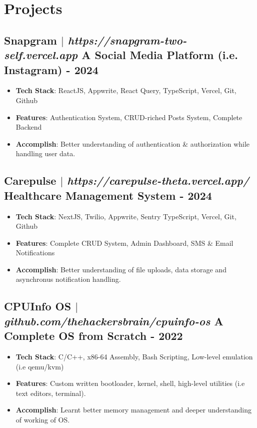 \documentclass[11pt]{article} %
\begin{document}
\section{Projects}
\subsection{Snapgram $|$ \normalfont\textit{https://snapgram-two-self.vercel.app} \hfill A Social Media Platform (i.e. Instagram) - \textbf{2024}}
\vspace{3pt}
\begin{itemize}
  \item \textbf{Tech Stack}: ReactJS, Appwrite, React Query, TypeScript, Vercel, Git, Github
  \item \textbf{Features}: Authentication System, CRUD-riched Posts System, Complete Backend
  \item \textbf{Accomplish}: Better understanding of authentication \& authorization while handling user data.
\end{itemize}

\subsection{Carepulse $|$ \normalfont\textit{https://carepulse-theta.vercel.app/} \hfill Healthcare Management System - \textbf{2024}}
\vspace{3pt}
\begin{itemize}
  \item \textbf{Tech Stack}: NextJS, Twilio, Appwrite, Sentry TypeScript, Vercel, Git, Github
  \item \textbf{Features}: Complete CRUD System, Admin Dashboard, SMS \& Email Notifications
  \item \textbf{Accomplish}: Better understanding of file uploads, data storage and asynchronus notification handling.
\end{itemize}

\subsection{CPUInfo OS $|$ \normalfont\textit{github.com/thehackersbrain/cpuinfo-os} \hfill A Complete OS from Scratch - \textbf{2022}}
\vspace{3pt}
\begin{itemize}
  \item \textbf{Tech Stack}: C/C++, x86-64 Assembly, Bash Scripting, Low-level emulation (i.e qemu/kvm)
  \item \textbf{Features}: Custom written bootloader, kernel, shell, high-level utilities (i.e text editors, terminal).
  \item \textbf{Accomplish}: Learnt better memory management and deeper understanding of working of OS.
\end{itemize}
\end{document}
